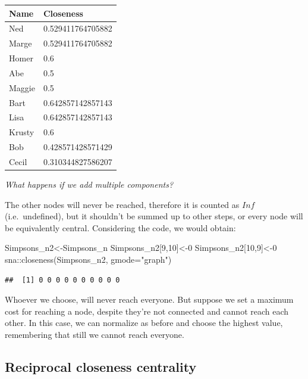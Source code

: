 \documentclass[
  notitlepage,
  onecolumn,
  openany]{book}
\newenvironment{Shaded}{\begin{snugshade}}{\end{snugshade}}
\newcommand{\AttributeTok}[1]{\textcolor[rgb]{0.77,0.63,0.00}{#1}}
\newcommand{\DecValTok}[1]{\textcolor[rgb]{0.00,0.00,0.81}{#1}}
\newcommand{\FunctionTok}[1]{\textcolor[rgb]{0.00,0.00,0.00}{#1}}
\newcommand{\NormalTok}[1]{#1}
\newcommand{\OtherTok}[1]{\textcolor[rgb]{0.56,0.35,0.01}{#1}}
\newcommand{\SpecialCharTok}[1]{\textcolor[rgb]{0.00,0.00,0.00}{#1}}
\newcommand{\StringTok}[1]{\textcolor[rgb]{0.31,0.60,0.02}{#1}}
\begin{document}
\begin{tabular}{l|l}
\hline
Name & Closeness\\
\hline
Ned & 0.529411764705882\\
\hline
Marge & 0.529411764705882\\
\hline
Homer & 0.6\\
\hline
Abe & 0.5\\
\hline
Maggie & 0.5\\
\hline
Bart & 0.642857142857143\\
\hline
Lisa & 0.642857142857143\\
\hline
Krusty & 0.6\\
\hline
Bob & 0.428571428571429\\
\hline
Cecil & 0.310344827586207\\
\hline
\end{tabular}

\emph{What happens if we add multiple components?}

The other nodes will never be reached, therefore it is counted as \(Inf\) (i.e.~undefined), but it shouldn't be summed up to other steps, or every node will be equivalently central. Considering the code, we would obtain:

\begin{Shaded}
\begin{Highlighting}[]
\NormalTok{Simpsons\_n2}\OtherTok{\textless{}{-}}\NormalTok{Simpsons\_n}
\NormalTok{Simpsons\_n2[}\DecValTok{9}\NormalTok{,}\DecValTok{10}\NormalTok{]}\OtherTok{\textless{}{-}}\DecValTok{0}
\NormalTok{Simpsons\_n2[}\DecValTok{10}\NormalTok{,}\DecValTok{9}\NormalTok{]}\OtherTok{\textless{}{-}}\DecValTok{0}
\NormalTok{sna}\SpecialCharTok{::}\FunctionTok{closeness}\NormalTok{(Simpsons\_n2, }\AttributeTok{gmode=}\StringTok{"graph"}\NormalTok{)}
\end{Highlighting}
\end{Shaded}

\begin{verbatim}
##  [1] 0 0 0 0 0 0 0 0 0 0
\end{verbatim}

Whoever we choose, will never reach everyone. But suppose we set a maximum cost for reaching a node, despite they're not connected and cannot reach each other. In this case, we can normalize as before and choose the highest value, remembering that still we cannot reach everyone.

\hypertarget{reciprocal-closeness-centrality}{%
\subsection{Reciprocal closeness centrality}\label{reciprocal-closeness-centrality}}
\end{document}

